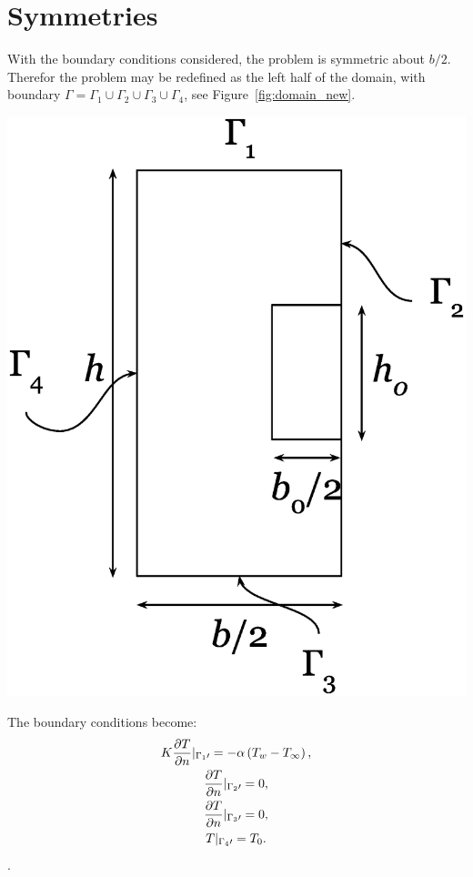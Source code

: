 \section{Symmetries}
With the boundary conditions considered, the problem is symmetric about $b/2$. Therefor the problem may be redefined as the left half of the domain, with boundary $\Gamma=\Gamma_1\cup\Gamma_2\cup\Gamma_3\cup\Gamma_4$, see Figure~\ref{fig:domain_new}. \begin{Figure}
 \centering
 \includegraphics[width=0.7\linewidth]{domain_new.eps}
 \label{fig:domain_new}
\end{Figure} The boundary conditions become:
\begin{equation}
\begin{gathered}
    K\frac{\partial T}{\partial n}\arrowvert_{\Gamma_1\prime} = -\alpha \left(T_w - T_{\infty}\right),\\
    \frac{\partial T}{\partial n}\arrowvert_{\Gamma_2\prime} = 0,\\
    \frac{\partial T}{\partial n}\arrowvert_{\Gamma_3\prime} = 0,\\
    T\arrowvert_{\Gamma_4\prime} = T_0.
\end{gathered}\label{eq:bc}
\end{equation}.


